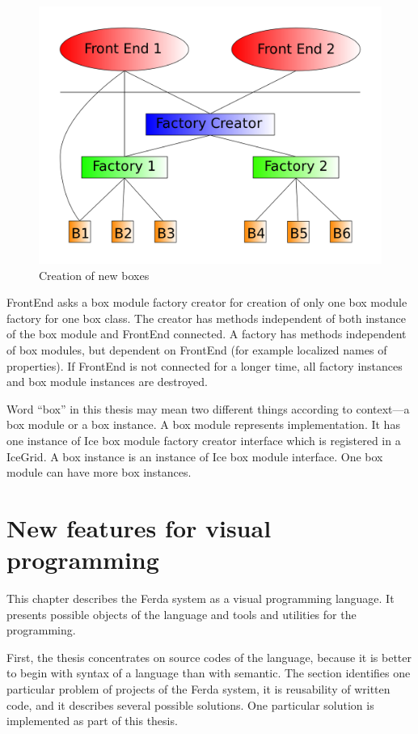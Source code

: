 \documentclass[a4paper,12pt]{book}
\begin{document}
\begin{figure}
	\noindent\includegraphics[width=1\textwidth]{creatorFactory}
	\caption{Creation of new boxes}
	\label{fig:creatorFactory}
\end{figure}

FrontEnd asks a box module factory creator for creation of only one box module factory for one box class. The creator has methods independent of both instance of the box module and FrontEnd connected. A factory has methods independent of box modules, but dependent on FrontEnd (for example localized names of properties). If FrontEnd is not connected for a longer time, all factory instances and box module instances are destroyed.

Word ``box'' in this thesis may mean two different things according to context---a box module or a box instance. A box module represents implementation. It has one instance of Ice box module factory creator interface which is registered in a IceGrid. A box instance is an instance of Ice box module interface. One box module can have more box instances.

\chapter{New features for visual programming}
This chapter describes the Ferda system as a visual programming language. It presents possible objects of the language and tools and utilities for the programming.

First, the thesis concentrates on source codes of the language, because it is better to begin with syntax of a language than with semantic. The section identifies one particular problem of projects of the Ferda system, it is reusability of written code, and it describes several possible solutions. One particular solution is implemented as part of this thesis.
\end{document}
